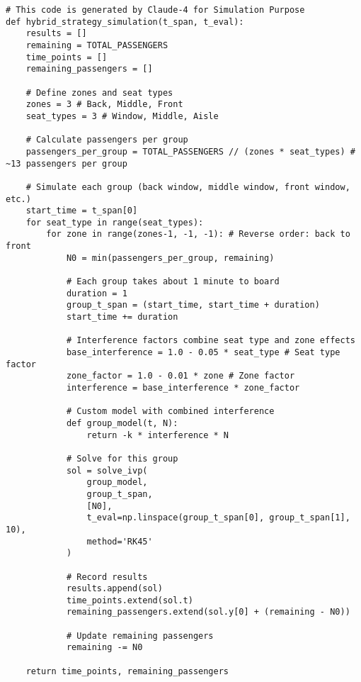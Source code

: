 \documentclass[12pt]{article}
\begin{document}
\begin{verbatim}
# This code is generated by Claude-4 for Simulation Purpose
def hybrid_strategy_simulation(t_span, t_eval):
    results = []
    remaining = TOTAL_PASSENGERS
    time_points = []
    remaining_passengers = []
    
    # Define zones and seat types
    zones = 3 # Back, Middle, Front
    seat_types = 3 # Window, Middle, Aisle
    
    # Calculate passengers per group
    passengers_per_group = TOTAL_PASSENGERS // (zones * seat_types) # ~13 passengers per group
    
    # Simulate each group (back window, middle window, front window, etc.)
    start_time = t_span[0]
    for seat_type in range(seat_types):
        for zone in range(zones-1, -1, -1): # Reverse order: back to front
            N0 = min(passengers_per_group, remaining)
            
            # Each group takes about 1 minute to board
            duration = 1
            group_t_span = (start_time, start_time + duration)
            start_time += duration
            
            # Interference factors combine seat type and zone effects
            base_interference = 1.0 - 0.05 * seat_type # Seat type factor
            zone_factor = 1.0 - 0.01 * zone # Zone factor
            interference = base_interference * zone_factor
            
            # Custom model with combined interference
            def group_model(t, N):
                return -k * interference * N
                
            # Solve for this group
            sol = solve_ivp(
                group_model,
                group_t_span,
                [N0],
                t_eval=np.linspace(group_t_span[0], group_t_span[1], 10),
                method='RK45'
            )
            
            # Record results
            results.append(sol)
            time_points.extend(sol.t)
            remaining_passengers.extend(sol.y[0] + (remaining - N0))
            
            # Update remaining passengers
            remaining -= N0
            
    return time_points, remaining_passengers
\end{verbatim}
\end{document}
